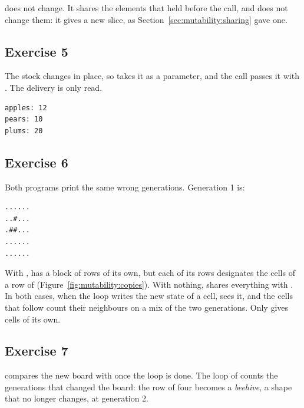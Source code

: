  does not change. It shares the elements that 
held before the call, and  does not change them: it gives
 a new slice, as Section~\ref{sec:mutability:sharing} gave
 one.

\subsection*{Exercise 5}

The stock changes in place, so  takes it as a 
parameter, and the call passes it with . The delivery is only read.


\vspace{-10pt}%
\begin{lstlisting}[style=bashVerb]
apples: 12
pears: 10
plums: 20
\end{lstlisting}

\subsection*{Exercise 6}

Both programs print the same wrong generations. Generation 1 is:

\begin{lstlisting}[style=bashVerb]
......
..#...
.##...
......
......
\end{lstlisting}

With ,  has a block of rows of its own, but each of
its rows designates the cells of a row of 
(Figure~\ref{fig:mutability:copies}). With nothing,  shares
everything with . In both cases, when the loop writes the new state
of a cell,  sees it, and the cells that follow count their
neighbours on a mix of the two generations. Only  gives
 cells of its own.

\subsection*{Exercise 7}

 compares the new board with  once the loop is done.
The loop of  counts the generations that changed the board: the
row of four becomes a \textit{beehive}, a shape that no longer changes, at
generation 2.

